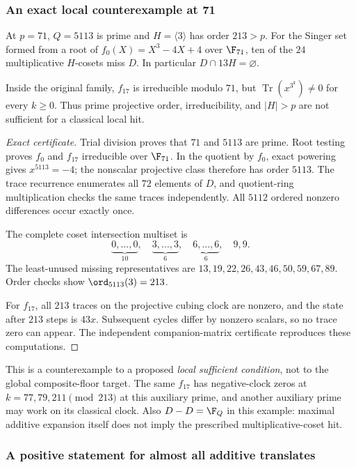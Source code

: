 \documentclass[11pt,a4paper]{article}
\theoremstyle{definition}\newtheorem{definition}[theorem]{Definition}
\theoremstyle{remark}\newtheorem{remark}[theorem]{Remark}
\DeclareMathOperator{\Tr}{Tr}\DeclareMathOperator{\tr}{tr}\DeclareMathOperator{\Nm}{N}
\begin{document}
\subsubsection{An exact local counterexample at 71}

\begin{proposition}\label{R18:prop:p71}
At $p=71$, $Q=5113$ is prime and $H=\langle3\rangle$ has order
$213>p$. For the Singer set formed from a root of
$f_0(X)=X^3-4X+4$ over $\F_{71}$, ten of the $24$ multiplicative
$H$-cosets miss $D$. In particular $D\cap13H=\varnothing$.

Inside the original family, $f_{17}$ is irreducible modulo $71$, but
$\Tr(x^{3^k})\ne0$ for every $k\ge0$. Thus prime projective order,
irreducibility, and $|H|>p$ are not sufficient for a classical local hit.
\end{proposition}
\begin{proof}[Exact certificate]
Trial division proves that $71$ and $5113$ are prime. Root testing
proves $f_0$ and $f_{17}$ irreducible over $\F_{71}$.
In the quotient by $f_0$, exact powering gives $x^{5113}=-4$;
the nonscalar projective class therefore has order $5113$.
The trace recurrence enumerates all $72$ elements of $D$, and
quotient-ring multiplication checks the same traces independently.
All $5112$ ordered nonzero differences occur exactly once.

The complete coset intersection multiset is
\[
 \underbrace{0,\ldots,0}_{10},\quad
 \underbrace{3,\ldots,3}_{6},\quad
 \underbrace{6,\ldots,6}_{6},\quad 9,9.
\]
The least-unused missing representatives are
$13,19,22,26,43,46,50,59,67,89$.
Order checks show $\ord_{5113}(3)=213$.

For $f_{17}$, all $213$ traces on the projective cubing clock are
nonzero, and the state after $213$ steps is $43x$. Subsequent cycles
differ by nonzero scalars, so no trace zero can appear. The independent
companion-matrix certificate reproduces these computations.
\end{proof}

This is a counterexample to a proposed \emph{local sufficient
condition}, not to the global composite-floor target. The same
$f_{17}$ has negative-clock zeros at $k=77,79,211\pmod{213}$ at
this auxiliary prime, and another auxiliary prime may work on its
classical clock. Also $D-D=\F_Q$ in this example: maximal additive
expansion itself does not imply the prescribed multiplicative-coset hit.

\subsubsection{A positive statement for almost all additive translates}
\end{document}
